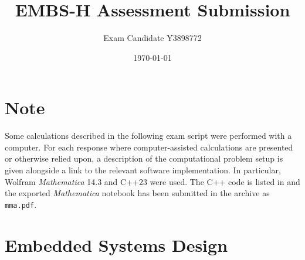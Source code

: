 \documentclass{article}
\title{EMBS-H Assessment Submission}
\date{\today}
\author{Exam Candidate Y3898772}
\numberwithin{equation}{section}
\numberwithin{table}{section}
\numberwithin{figure}{section}
\begin{document}
\maketitle
\tableofcontents
\setlength\parskip{1ex}

\section*{Note}
Some calculations described in the following exam script were performed with a
computer. For each response where computer-assisted calculations are presented
or otherwise relied upon, a description of the computational problem setup is
given alongside a link to the relevant software implementation. In particular,
Wolfram \emph{Mathematica} 14.3 and C++23 were used. The C++ code is listed in
 and the exported \emph{Mathematica} notebook has been submitted
in the archive as \texttt{mma.pdf}.

\section{Embedded Systems Design}
\end{document}
